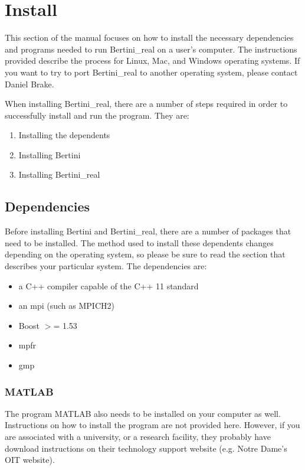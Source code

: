 
\section{Install}


\label{sec:installation}
	This section of the manual focuses on how to install the necessary dependencies and programs needed to run Bertini\_real on a user's computer. The instructions provided describe the process for Linux, Mac, and Windows operating systems. If you want to try to port Bertini\_real to another operating system, please contact Daniel Brake. 

	When installing Bertini\_real, there are a number of steps required in order to successfully install and run the program. They are:
\begin{enumerate}
\item Installing the \glspl{dependent}
\item Installing Bertini
\item Installing Bertini\_real
\end{enumerate}




\subsection{Dependencies}

Before installing Bertini and Bertini\_real, there are a number of packages that need to be installed. The method used to install these \glspl{dependent} changes depending on the operating system, so please be sure to read the section that describes your particular system.
The dependencies are: 
\begin{itemize}
\item a C++ compiler capable of the C++ 11 standard
\item an \gls{mpi} (such as MPICH2)
\item Boost $>$= 1.53
\item \gls{mpfr}
\item \gls{gmp}
\end{itemize} \cite[p.~4]{Br15}

	\subsubsection*{MATLAB}
The program MATLAB also needs to be installed on your computer as well. Instructions on how to install the program are not provided here. However, if you are associated with a university, or a research facility, they probably have download instructions on their technology support website (e.g. Notre Dame's OIT website). 

